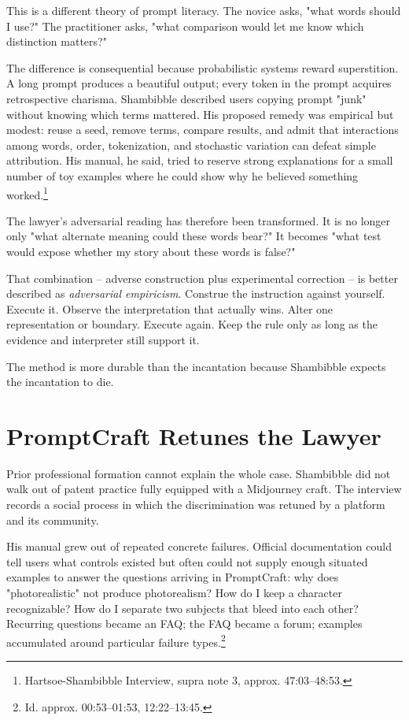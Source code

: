 \documentclass[11pt]{article}
\begin{document}
This is a different theory of prompt literacy. The novice asks, "what words should I use?" The practitioner asks, "what comparison would let me know which distinction matters?"

The difference is consequential because probabilistic systems reward superstition. A long prompt produces a beautiful output; every token in the prompt acquires retrospective charisma. Shambibble described users copying prompt "junk" without knowing which terms mattered. His proposed remedy was empirical but modest: reuse a seed, remove terms, compare results, and admit that interactions among words, order, tokenization, and stochastic variation can defeat simple attribution. His manual, he said, tried to reserve strong explanations for a small number of toy examples where he could show why he believed something worked.\footnote{Hartsoe-Shambibble Interview, supra note 3, approx. 47:03--48:53.}

The lawyer's adversarial reading has therefore been transformed. It is no longer only "what alternate meaning could these words bear?" It becomes "what test would expose whether my story about these words is false?"

That combination -- adverse construction plus experimental correction -- is better described as \textit{adversarial empiricism}. Construe the instruction against yourself. Execute it. Observe the interpretation that actually wins. Alter one representation or boundary. Execute again. Keep the rule only as long as the evidence and interpreter still support it.

The method is more durable than the incantation because Shambibble expects the incantation to die.

\section{PromptCraft Retunes the Lawyer}

Prior professional formation cannot explain the whole case. Shambibble did not walk out of patent practice fully equipped with a Midjourney craft. The interview records a social process in which the discrimination was retuned by a platform and its community.

His manual grew out of repeated concrete failures. Official documentation could tell users what controls existed but often could not supply enough situated examples to answer the questions arriving in PromptCraft: why does "photorealistic" not produce photorealism? How do I keep a character recognizable? How do I separate two subjects that bleed into each other? Recurring questions became an FAQ; the FAQ became a forum; examples accumulated around particular failure types.\footnote{Id. approx. 00:53--01:53, 12:22--13:45.}
\end{document}
